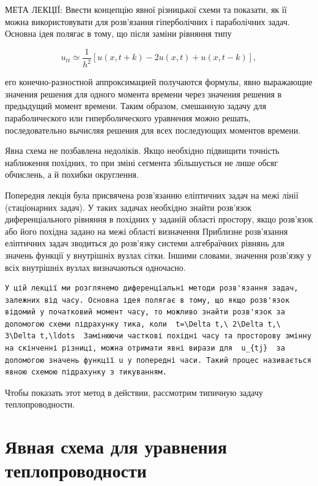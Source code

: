 \documentclass[
  ukrainian,
]{article}
\begin{document}
МЕТА ЛЕКЦІЇ: Ввести концепцію явної різницької схеми та показати, як її
можна використовувати для розв'язання гіперболічних і параболічних
задач. Основна ідея полягає в тому, що після заміни рівняння типу

\[
u_{tt} \simeq \frac{1}{h^2} [u(x, t+k) - 2u(x, t) + u(x, t-k)],
\]

его конечно-разностной аппроксимацией получаются формулы, явно
выражающие значения решения для одного момента времени через значения
решения в предыдущий момент времени. Таким образом, смешанную задачу для
параболического или гиперболического уравнения можно решать,
последовательно вычисляя решения для всех последующих моментов времени.

Явна схема не позбавлена недоліків. Якщо необхідно підвищити точність
наближення похідних, то при зміні сегмента збільшується не лише обсяг
обчислень, а й похибки округлення.

Попередня лекція була присвячена розв'язанню еліптичних задач на межі
лінії (стаціонарних задач). У таких задачах необхідно знайти розв'язок
диференціального рівняння в похідних у заданій області простору, якщо
розв'язок або його похідна задано на межі області визначення Приблизне
розв'язання еліптичних задач зводиться до розв'язку системи алгебраїчних
рівнянь для значень функції у внутрішніх вузлах сітки. Іншими словами,
значення розв'язку у всіх внутрішніх вузлах визначаються одночасно.

\begin{verbatim}
У цій лекції ми розглянемо диференціальні методи розв'язання задач, залежних від часу. Основна ідея полягає в тому, що якщо розв'язок відомий у початковий момент часу, то можливо знайти розв'язок за допомогою схеми підрахунку тика, коли  t=\Delta t,\ 2\Delta t,\ 3\Delta t,\ldots  Замінюючи часткові похідні часу та просторову змінну на скінченні різниці, можна отримати явні вирази для  u_{tj}  за допомогою значень функції u у попередні часи. Такий процес називається явною схемою підрахунку з тикуванням.
\end{verbatim}

Чтобы показать этот метод в действии, рассмотрим типичную задачу
теплопроводности.

\section{Явная схема для уравнения
теплопроводности}\label{ux44fux432ux43dux430ux44f-ux441ux445ux435ux43cux430-ux434ux43bux44f-ux443ux440ux430ux432ux43dux435ux43dux438ux44f-ux442ux435ux43fux43bux43eux43fux440ux43eux432ux43eux434ux43dux43eux441ux442ux438}
\end{document}
